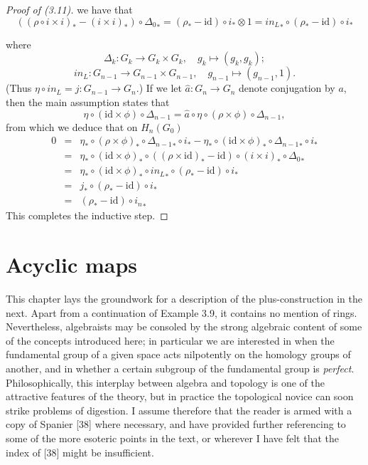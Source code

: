 \documentclass[openany,leqno]{book}  %
\newcommand{\id}{\mathrm{id}} %
\begin{document}
\begin{proof}[Proof of (3.11)]
we have that
\[((\rho \circ i\times i)_*-(i\times i)_*)\circ {\Delta_0}_*=(\rho_*-\id)\circ i_* \otimes 1 = {in_{L}}_* \circ (\rho_*-\id)\circ i_*\]

where
\[\Delta_k \colon   G_k \longrightarrow G_k \times G_k, \quad g_k \mapsto (g_k,g_k);\]
\[in_L\colon  G_{n-1}\longrightarrow G_{n-1} \times G_{n-1},\quad  g_{n-1} \mapsto (g_{n-1},1).\]
(Thus $\eta\circ in_L=j\colon   G_{n-1}\longrightarrow G_n$.)
If we let $\hat{a}\colon   G_n\longrightarrow G_n$ denote conjugation by $a$, then the main assumption states that 
\[\eta \circ (\id \times \phi)\circ \Delta_{n-1} =\hat{a} \circ \eta \circ (\rho\times \phi)\circ \Delta_{n-1},\]
from which we deduce that on $H_n(G_0)$
\[\begin{array}{ccl}
0 & =& \eta_* \circ (\rho \times \phi)_* \circ {\Delta_{n-1}}_* \circ i_*-\eta_* \circ (\id \times \phi)_* \circ {\Delta_{n-1}}_*\circ i_* \\
 & =&\eta_* \circ (\id \times \phi)_* \circ ((\rho \times \id)_* -\id) \circ (i\times i)_* \circ {\Delta_0}_* \\
 & =&\eta_* \circ (\id \times \phi)_* \circ {in_L}_* \circ (\rho_* -\id) \circ i_* \\
 & =& j_*\circ (\rho_* -\id) \circ i_* \\
 & =&(\rho_* -\id) \circ {i_n}_*
\end{array}
\]
This completes the inductive step.
\end{proof}

\chapter{Acyclic maps} %
\label{cha:4acyclic_maps}
This chapter lays the groundwork for a description of the plus-construction in the next. Apart from a continuation of Example 3.9, it contains no mention of rings. Nevertheless, algebraists may be consoled by the strong algebraic content of some of the concepts introduced here; in particular we are interested in when the fundamental group of a given space acts nilpotently on the homology groups of another, and in whether a certain subgroup of the fundamental group is {\em perfect}. Philosophically, this interplay between algebra and topology is one of the attractive features of the theory, but in practice the topological novice can soon strike problems of digestion. I assume therefore that the reader is armed with a copy of Spanier [38] where necessary, and have provided further referencing to some of the more esoteric points in the text, or wherever I have felt that the index of [38] might be insufficient.
\end{document}
